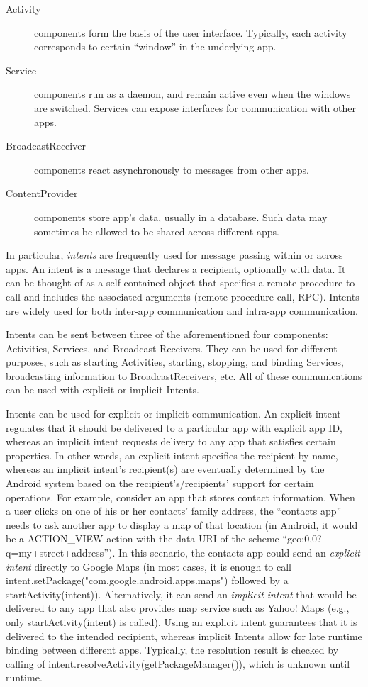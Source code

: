 \begin{description}
	\item[Activity] components form the basis of the user interface. Typically, each activity corresponds to certain ``window'' in the underlying app.
	\item[Service] components run as a daemon, and remain active even when the windows are switched. Services can expose interfaces for communication with other apps.
	\item[BroadcastReceiver] components react asynchronously to messages from other apps.
	\item[ContentProvider] components store app's data, usually in a database. Such data may sometimes be allowed to be shared across different apps.
\end{description}

In particular, \emph{intents} are frequently used for message passing within or across apps. An intent is a message that declares a recipient, optionally with data. It can be thought of as a self-contained object that specifies a remote procedure to call and includes the associated arguments (remote procedure call, RPC). Intents are widely used for both inter-app communication and intra-app communication.

Intents can be sent between three of the aforementioned four components: Activities, Services, and Broadcast Receivers. They can be used for different purposes, such as starting Activities, starting, stopping, and binding Services, broadcasting information to BroadcastReceivers, etc. All of these communications can be used with explicit or implicit Intents.

Intents can be used for explicit or implicit communication. An explicit intent regulates that it should be delivered to a particular app with explicit app ID, whereas an implicit intent requests delivery to any app that satisfies certain properties. In other words, an explicit intent specifies the recipient by name, whereas an implicit intent's recipient(s) are eventually determined by the Android system based on the recipient's/recipients' support for certain operations. For example, consider an app that stores contact information. When a user clicks on one of his or her contacts' family address, the ``contacts app'' needs to ask another app to display a map of that location (in Android, it would be a \textsf{ACTION\_VIEW} action with the data URI of the scheme ``\textsf{geo:0,0?q=my+street+address}''). In this scenario, the contacts app could send an \emph{explicit intent} directly to Google Maps (in most cases, it is enough to call \textsf{intent.setPackage("com.google.android.apps.maps")} followed by a \textsf{startActivity(intent)}). Alternatively, it can send an \emph{implicit intent} that would be delivered to any app that also provides map service such as Yahoo! Maps (e.g., only \textsf{startActivity(intent)} is called). Using an explicit intent guarantees that it is delivered to the intended recipient, whereas implicit Intents allow for late runtime binding between different apps. {Typically, the resolution result is checked by calling of \textsf{intent.resolveActivity(getPackageManager())}, which is unknown until runtime.}